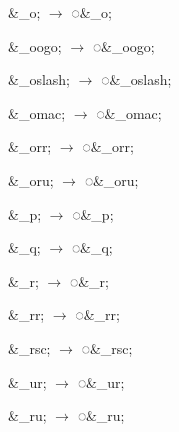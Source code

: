 \documentclass[letterpaper,12pt]{article}
\newcommand\textstyleEntityRef[1]{\textrm{#1}}
\begin{document}
\begin{multicols}{3}
\textcolor[rgb]{0.20392157,0.39607844,0.6431373}{\&\_{\textcompwordmark}o; $\rightarrow $
}\textstyleEntityRef{\textcolor[rgb]{0.20392157,0.39607844,0.6431373}{◌\&\_o;}}

\textcolor[rgb]{0.20392157,0.39607844,0.6431373}{\&\_{\textcompwordmark}oogo; $\rightarrow $
}\textstyleEntityRef{\textcolor[rgb]{0.20392157,0.39607844,0.6431373}{◌\&\_oogo;}}

\textcolor[rgb]{0.20392157,0.39607844,0.6431373}{\narrow\&\_{\textcompwordmark}oslash; $\rightarrow $
}\textstyleEntityRef{\textcolor[rgb]{0.20392157,0.39607844,0.6431373}{◌\&\_oslash;}}

\textcolor[rgb]{0.20392157,0.39607844,0.6431373}{\&\_{\textcompwordmark}omac; $\rightarrow $
}\textstyleEntityRef{\textcolor[rgb]{0.20392157,0.39607844,0.6431373}{◌\&\_omac;}}

\textcolor[rgb]{0.20392157,0.39607844,0.6431373}{\&\_{\textcompwordmark}orr; $\rightarrow $
}\textstyleEntityRef{\textcolor[rgb]{0.20392157,0.39607844,0.6431373}{◌\&\_orr;}}

\textcolor[rgb]{0.20392157,0.39607844,0.6431373}{\&\_{\textcompwordmark}oru; $\rightarrow $
}\textstyleEntityRef{\textcolor[rgb]{0.20392157,0.39607844,0.6431373}{◌\&\_oru;}}

\textcolor[rgb]{0.20392157,0.39607844,0.6431373}{\&\_{\textcompwordmark}p; $\rightarrow $
}\textstyleEntityRef{\textcolor[rgb]{0.20392157,0.39607844,0.6431373}{◌\&\_p;}}

\textcolor[rgb]{0.20392157,0.39607844,0.6431373}{\&\_{\textcompwordmark}q; $\rightarrow $
}\textstyleEntityRef{\textcolor[rgb]{0.20392157,0.39607844,0.6431373}{◌\&\_q;}}

\textstyleEntityRef{\textcolor[rgb]{0.20392157,0.39607844,0.6431373}{\&\_{\textcompwordmark}r; $\rightarrow $
◌\&\_r;}}

\textcolor[rgb]{0.20392157,0.39607844,0.6431373}{\&\_{\textcompwordmark}rr; $\rightarrow $
}\textstyleEntityRef{\textcolor[rgb]{0.20392157,0.39607844,0.6431373}{◌\&\_rr;}}

\textcolor[rgb]{0.20392157,0.39607844,0.6431373}{\&\_{\textcompwordmark}rsc; $\rightarrow $
}\textstyleEntityRef{\textcolor[rgb]{0.20392157,0.39607844,0.6431373}{◌\&\_rsc;}}

\textcolor[rgb]{0.20392157,0.39607844,0.6431373}{\&\_{\textcompwordmark}ur; $\rightarrow $
}\textstyleEntityRef{\textcolor[rgb]{0.20392157,0.39607844,0.6431373}{◌\&\_ur;}}

\textcolor[rgb]{0.20392157,0.39607844,0.6431373}{\&\_{\textcompwordmark}ru; $\rightarrow $
}\textstyleEntityRef{\textcolor[rgb]{0.20392157,0.39607844,0.6431373}{◌\&\_ru;}}


\end{multicols}
\end{document}
